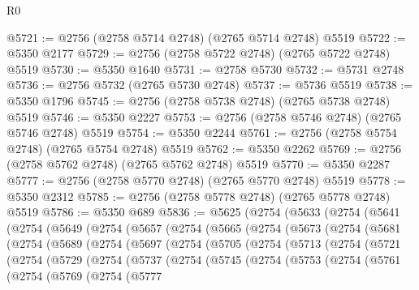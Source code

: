 \begin{lexlean}{R0}
\begin{coremodule}
@5721 := @2756 (@2758 @5714 @2748) (@2765 @5714 @2748) @5519
@5722 := @5350 @2177
@5729 := @2756 (@2758 @5722 @2748) (@2765 @5722 @2748) @5519
@5730 := @5350 @1640
@5731 := @2758 @5730
@5732 := @5731 @2748
@5736 := @2756 @5732 (@2765 @5730 @2748)
@5737 := @5736 @5519
@5738 := @5350 @1796
@5745 := @2756 (@2758 @5738 @2748) (@2765 @5738 @2748) @5519
@5746 := @5350 @2227
@5753 := @2756 (@2758 @5746 @2748) (@2765 @5746 @2748) @5519
@5754 := @5350 @2244
@5761 := @2756 (@2758 @5754 @2748) (@2765 @5754 @2748) @5519
@5762 := @5350 @2262
@5769 := @2756 (@2758 @5762 @2748) (@2765 @5762 @2748) @5519
@5770 := @5350 @2287
@5777 := @2756 (@2758 @5770 @2748) (@2765 @5770 @2748) @5519
@5778 := @5350 @2312
@5785 := @2756 (@2758 @5778 @2748) (@2765 @5778 @2748) @5519
@5786 := @5350 @689
@5836 := @5625
    (@2754
      (@5633
        (@2754
          (@5641
            (@2754
              (@5649
                (@2754
                  (@5657
                    (@2754
                      (@5665
                        (@2754
                          (@5673
                            (@2754
                              (@5681
                                (@2754
                                  (@5689
                                    (@2754
                                      (@5697
                                        (@2754
                                          (@5705
                                            (@2754
                                              (@5713
                                                (@2754
                                                  (@5721
                                                    (@2754
                                                      (@5729
                                                        (@2754
                                                          (@5737
                                                            (@2754
                                                              (@5745
                                                                (@2754
                                                                  (@5753
                                                                    (@2754
                                                                      (@5761
                                                                        (@2754
                                                                          (@5769
                                                                            (@2754
                                                                              (@5777

\end{coremodule}
\end{lexlean}
